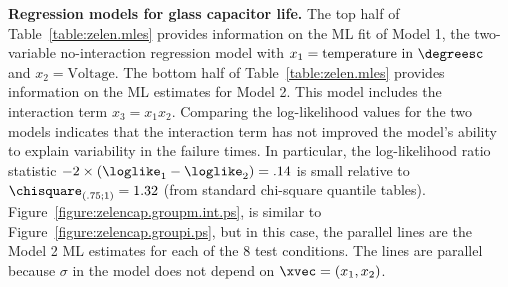 \begin{example}
\label{example:zelen.data.int.model}
{\bf Regression models for glass capacitor life.} The top half of
Table~\ref{table:zelen.mles} provides information on the ML fit of
Model 1, the two-variable no-interaction regression model with
$x_{1}=\mbox{temperature in $\degreesc$}$ and $x_{2}=\mbox{Voltage}$.
The bottom half of Table~\ref{table:zelen.mles} provides information
on the ML estimates for Model 2.  This model includes the interaction
term $x_{3}=x_{1} x_{2}$.  Comparing the log-likelihood values for the
two models indicates that the interaction term has not improved the
model's ability to explain variability in the failure times. In
particular, the log-likelihood ratio statistic $-2 \times (\loglike_{1}
- \loglike_{2}) = .14$ is small relative to $\chisquare_{(.75;1)}=1.32$
(from standard chi-square quantile tables).
Figure~\ref{figure:zelencap.groupm.int.ps}, is similar to
Figure~\ref{figure:zelencap.groupi.ps}, but in this case, the parallel
lines are the Model 2 ML estimates for each of the 8 test conditions.
The lines are parallel because $\sigma$ in the model does not depend
on $\xvec=(x_{1},x_{2})$.  


\end{example}
